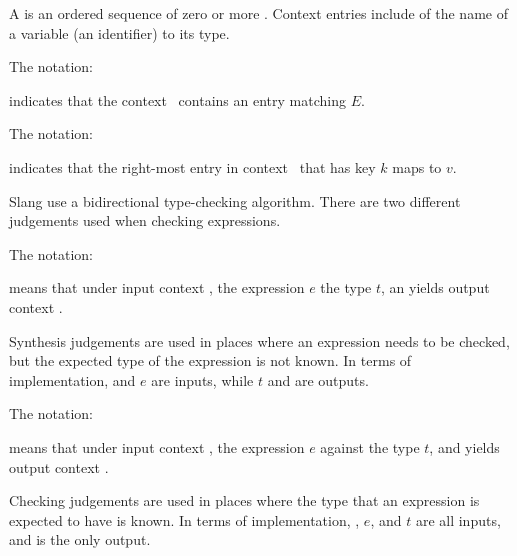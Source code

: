 

A  is an ordered sequence of zero or more .
Context entries include  of the name of a variable (an identifier) to its type.

The notation:
\begin{center}
\end{center}
indicates that the context \ContextVarA\ contains an entry matching $E$.

The notation:
\begin{center}
\end{center}
indicates that the right-most entry in context \ContextVarA\ that has key $k$ maps to $v$.


Slang use a bidirectional type-checking algorithm.
There are two different judgements used when checking expressions.


The notation:
\begin{center}
\end{center}
means that under input context \ContextVarA, the expression $e$  the type $t$, an yields output context \ContextVarB.

\begin{Description}
Synthesis judgements are used in places where an expression needs to be checked, but the expected type of the expression is not known.
In terms of implementation, \ContextVarA and $e$ are inputs, while $t$ and \ContextVarB are outputs.
\end{Description}


The notation:
\begin{center}
\end{center}
means that under input context \ContextVarA, the expression $e$  against the type $t$, and yields output context \ContextVarB.

\begin{Description}
Checking judgements are used in places where the type that an expression is expected to have is known.
In terms of implementation, \ContextVarA, $e$, and $t$ are all inputs, and \ContextVarB is the only output.
\end{Description}


